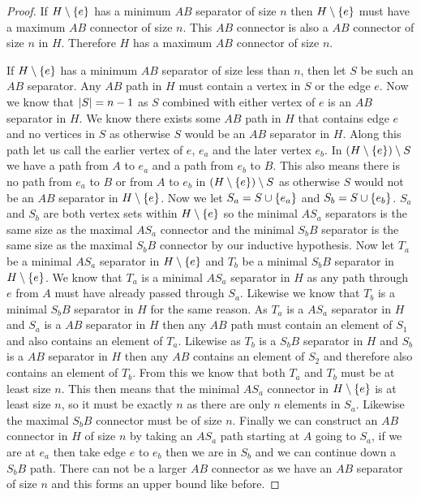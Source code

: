 \documentclass{article}
\begin{document}
\begin{proof}
	If $H\setminus\left\{ {e} \right\}$ has a minimum $AB$ separator of size $n$ then $H\setminus\left\{ {e} \right\}$ must have a maximum $AB$ connector of size $n$. This $AB$ connector is also a $AB$ connector of size $n$ in $H$. Therefore $H$ has a maximum $AB$ connector of size $n$.
	
	If $H\setminus\left\{ {e} \right\}$ has a minimum $AB$ separator of size less than $n$, then let $S$ be such an $AB$ separator. Any $AB$ path in $H$ must contain a vertex in $S$ or the edge $e$. Now we know that $\left| {S} \right| = n-1$ as $S$ combined with either vertex of $e$ is an $AB$ separator in $H$. We know there exists some $AB$ path in $H$ that contains edge $e$ and no vertices in $S$ as otherwise $S$ would be an $AB$ separator in $H$. Along this path let us call the earlier vertex of $e$, $e_a$ and the later vertex $e_b$. In $(H\setminus\left\{ {e} \right\})\setminus S$ we have a path from $A$ to $e_a$ and a path from $e_b$ to $B$. This also means there is no path from $e_a$ to $B$ or from $A$ to $e_b$ in $(H\setminus \left\{ {e} \right\})\setminus S$ as otherwise $S$ would not be an $AB$ separator in $H\setminus\left\{ {e} \right\}$. Now we let $S_a = S\cup\left\{ {e_a} \right\}$ and $S_b = S\cup\left\{ {e_b} \right\}$. $S_a$ and $S_b$ are both vertex sets within $H\setminus\left\{ {e} \right\}$ so the minimal $AS_a$ separators is the same size as the maximal $AS_a$ connector and the minimal $S_bB$ separator is the same size as the maximal $S_bB$ connector by our inductive hypothesis. Now let $T_a$ be a minimal $AS_a$ separator in $H\setminus\left\{ {e} \right\}$ and $T_b$ be a minimal $S_bB$ separator in $H\setminus\left\{ {e} \right\}$. We know that $T_a$ is a minimal $AS_a$ separator in $H$ as any path through $e$ from $A$ must have already passed through $S_a$. Likewise we know that $T_b$ is a minimal $S_bB$ separator in $H$ for the same reason.  As $T_a$ is a $AS_a$ separator in $H$ and $S_a$ is a $AB$ separator in $H$ then any $AB$ path must contain an element of $S_1$ and also contains an element of $T_a$. Likewise as $T_b$ is a $S_bB$ separator in $H$ and $S_b$ is a $AB$ separator in $H$ then any $AB$ contains an element of $S_2$ and therefore also contains an element of $T_b$. From this we know that both $T_a$ and $T_b$ must be at least size $n$. This then means that the minimal $AS_a$ connector in $H\setminus\left\{ {e} \right\}$ is at least size $n$, so it must be exactly $n$ as there are only $n$ elements in $S_a$. Likewise the maximal $S_bB$ connector must be of size $n$. Finally we can construct an $AB$ connector in $H$ of size $n$ by taking an $AS_a$ path starting at $A$ going to $S_a$, if we are at $e_a$ then take edge $e$ to $e_b$ then we are in $S_b$ and we can continue down a $S_bB$ path. There can not be a larger $AB$ connector as we have an $AB$ separator of size $n$ and this forms an upper bound like before.
	

\end{proof}
\end{document}
